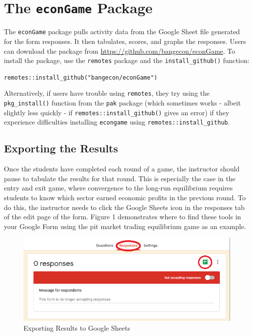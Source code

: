 \documentclass[
]{article}
\begin{document}
\hypertarget{the-econgame-package}{%
\section{\texorpdfstring{The \texttt{econGame}
Package}{The econGame Package}}\label{the-econgame-package}}

The \texttt{econGame} package pulls activity data from the Google Sheet
file generated for the form responses. It then tabulates, scores, and
graphs the responses. Users can download the package from
\url{https://github.com/bangecon/econGame}. To install the package, use
the \texttt{remotes} package and the \texttt{install\_github()}
function:

\texttt{remotes::install\_github("bangecon/econGame")}

Alternatively, if users have trouble using \texttt{remotes}, they try
using the \texttt{pkg\_install()} function from the \texttt{pak} package
(which sometimes works - albeit slightly less quickly - if
\texttt{remotes::install\_github()} gives an error) if they experience
difficulties installing \texttt{econgame} using
\texttt{remotes::install\_github}.

\hypertarget{exporting-the-results}{%
\subsection{Exporting the Results}\label{exporting-the-results}}

Once the students have completed each round of a game, the instructor
should pause to tabulate the results for that round. This is especially
the case in the entry and exit game, where convergence to the long-run
equilibrium requires students to know which sector earned economic
profits in the previous round. To do this, the instructor needs to click
the Google Sheets icon in the responses tab of the edit page of the
form. Figure 1 demonstrates where to find these tools in your Google
Form using the pit market trading equilibrium game as an example.

\begin{figure}
\centering
\includegraphics{images/Figure1.png}
\caption{Exporting Results to Google Sheets}
\end{figure}
\end{document}
